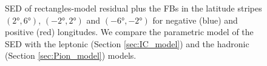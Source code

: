 \begin{figure}[h!]

  	\caption{SED of rectangles-model residual plus the FBs in the latitude stripes $(\ang{2}, \ang{6})$, $(\ang{-2}, \ang{2})$ and $(\ang{-6}, \ang{-2})$ for negative (blue) and positive (red) longitudes. We compare the parametric model of the SED with the leptonic (Section \ref{sec:IC_model}) 
	and the hadronic (Section \ref{sec:Pion_model}) models.}
  	\label{fig:SED_with_fits}
\end{figure}

